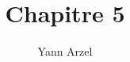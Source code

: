 \documentclass{article}
\begin{document}
\title{Chapitre 5}
\author{Yann Arzel}

\maketitle
	

\end{document}
